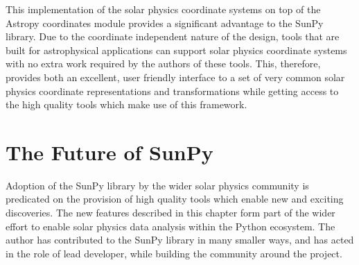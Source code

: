 \documentclass[a4paper,12pt,fourier,authoryear,custommargin]{Classes/PhDThesisPSnPDF}
\begin{document}
This implementation of the solar physics coordinate systems on top of the Astropy coordinates module provides a significant advantage to the SunPy library.
Due to the coordinate independent nature of the design, tools that are built for astrophysical applications can support solar physics coordinate systems with no extra work required by the authors of these tools.
This, therefore, provides both an excellent, user friendly interface to a set of very common solar physics coordinate representations and transformations while getting access to the high quality tools which make use of this framework.

\section{The Future of SunPy}

Adoption of the SunPy library by the wider solar physics community is predicated on the provision of high quality tools which enable new and exciting discoveries.
The new features described in this chapter form part of the wider effort to enable solar physics data analysis within the Python ecosystem.
The author has contributed to the SunPy library in many smaller ways, and has acted in the role of lead developer, while building the community around the project.

\clearpage{}%
%





\begin{spacing}{1.1}



\cleardoublepage





\end{spacing}
\end{document}
